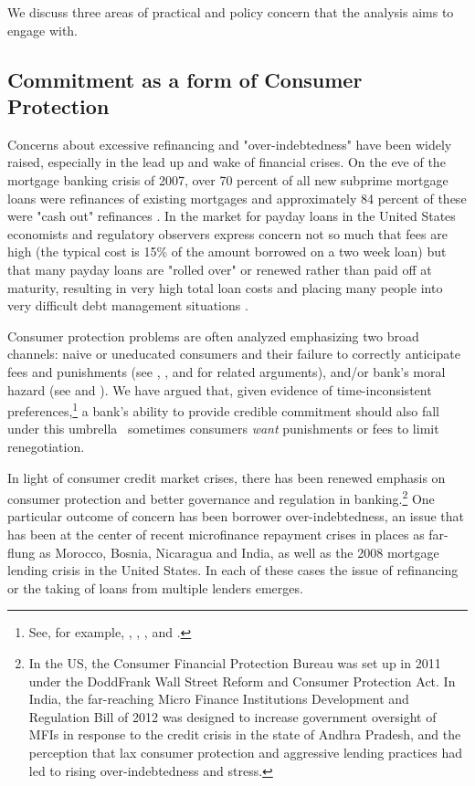 \documentclass[11pt,english]{article}
\theoremstyle{plain}
\theoremstyle{definition}
\begin{document}
We discuss three areas of practical and policy concern that the
analysis aims to engage with.

\subsection{Commitment as a form of Consumer Protection}

Concerns about excessive refinancing and "over-indebtedness" have
been widely raised, especially in the lead up and wake of financial crises.
On the eve of the mortgage banking crisis of 2007, over 70 percent
of all new subprime mortgage loans were refinances of existing mortgages
and approximately 84 percent of these were "cash out" refinances \citep{demyanyk2011}.
In the market for payday loans in the United States economists and
regulatory observers express concern not so much that fees are high
(the typical cost is 15\% of the amount borrowed on a two week loan)
but that many payday loans are "rolled over" or renewed
rather than paid off at maturity, resulting in very high total loan costs and placing
many people into very difficult debt management situations \citep{deyoung2015}.

Consumer protection problems are often analyzed emphasizing two
broad channels: naive or uneducated consumers and their failure to correctly
anticipate fees and punishments (see \citet{gabaix2006},
\citet{armstrong2012}, and \citet{akerlof2015} for related arguments),
and/or bank's moral hazard (see \citet{dewatripont1999} and \citet{oak2010}).
We have argued that, given evidence of time-inconsistent
preferences,\footnote{See, for example, \citet{laibson2003}, \citet{ashraf2006},
\citet{gugerty2007}, and \citet{tanaka2010}.} a bank's ability to provide credible commitment should also fall
under this umbrella \textendash\  sometimes consumers \textit{want} punishments
or fees to limit renegotiation.

In light of consumer credit
market crises, there has been renewed emphasis on consumer protection and
better governance and regulation in banking.\footnote{In the US, the Consumer Financial Protection Bureau was set up in
2011 under the Dodd\textendash Frank Wall Street Reform and Consumer
Protection Act. In India, the far-reaching Micro Finance Institutions
Development and Regulation Bill of 2012 was designed to increase government
oversight of MFIs in response to the credit crisis in the state of
Andhra Pradesh, and the perception that lax consumer protection and
aggressive lending practices had led to rising over-indebtedness and
stress.} One particular outcome of concern has been borrower over-indebtedness,
an issue that has been at the center of recent microfinance repayment
crises in places as far-flung as Morocco, Bosnia, Nicaragua and India,
as well as the 2008 mortgage lending crisis in the United States.
In each of these cases the issue of refinancing or the taking of loans
from multiple lenders emerges.
\end{document}
